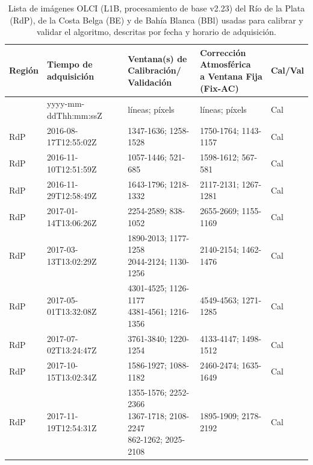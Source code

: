         \begin{table}
        \small
        \caption{Lista de imágenes OLCI (L1B, procesamiento de base v2.23) del Río de la Plata (RdP), de la Costa Belga (BE) y de Bahía Blanca (BBl) usadas para calibrar y validar el algoritmo, descritas por fecha y horario de adquisición.}
        \begin{tabular}{|l|l|l|l|l|}
        \hline
        \textbf{Región} & \textbf{Tiempo de adquisición} & \makecell[tl]{\textbf{Ventana(s) de}\\ \textbf{Calibración/} \\ \textbf{Validación}} & \makecell[tl]{\textbf{Corrección}\\\textbf{Atmosférica}\\\textbf{a Ventana Fija}\\\textbf{(Fix-AC)}} & \textbf{Cal/Val}\\
        \hline
         & yyyy-mm-ddThh:mm:ssZ & líneas; píxels & líneas; píxels & Cal\\
        \hline
        RdP & 2016-08-17T12:55:02Z & 1347-1636; 1258-1528 & 1750-1764; 1143-1157 & Cal\\
        \hline
        RdP & 2016-11-10T12:51:59Z & 1057-1446; 521-685 & 1598-1612; 567-581 & Cal\\
        \hline
        RdP & 2016-11-29T12:58:49Z & 1643-1796; 1218-1332 & 2117-2131; 1267-1281 & Cal\\
        \hline
        RdP & 2017-01-14T13:06:26Z & 2254-2589; 838-1052 & 2655-2669; 1155-1169 & Cal\\
        \hline
        RdP & 2017-03-13T13:02:29Z & \makecell[tl]{1890-2013; 1177-1258\\2044-2124; 1130-1256} & 2140-2154; 1462-1476 & Cal\\
        \hline
        RdP & 2017-05-01T13:32:08Z & \makecell[tl]{4301-4525; 1126-1177\\4381-4561; 1216-1356} & 4549-4563; 1271-1285 & Cal\\
        \hline
        RdP & 2017-07-02T13:24:47Z & 3761-3840; 1220-1254 & 4133-4147; 1498-1512 & Cal\\
        \hline
        RdP & 2017-10-15T13:02:34Z & 1586-1927; 1088-1182 & 2460-2474; 1635-1649 & Cal\\
        \hline
        RdP & 2017-11-19T12:54:31Z & \makecell[tl]{1355-1576; 2252-2366\\1367-1718; 2108-2247\\862-1262; 2025-2108} & 1895-1909; 2178-2192 & Cal\\

\end{tabular}
\end{table}
